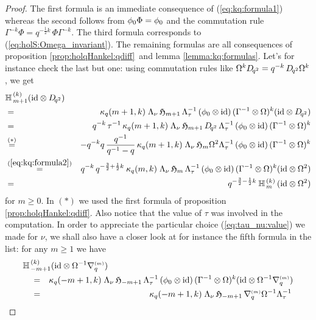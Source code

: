 \begin{proof}
The first formula is an immediate consequence of (\ref{eq:kq:formula1})
whereas the second follows from $\phi_0 \Phi = \phi_0$ and the commutation rule
$\Gamma^{-k}\Phi = q^{-\frac{1}{2}k}\,\Phi\Gamma^{-k}$.
The third formula corresponds to (\ref{eq:holS:Omega_invariant}).
The remaining formulas are all consequences of
proposition \ref{prop:holqHankel:qdiff}\ and lemma \ref{lemma:kq:formulas}\@.
Let's for instance check the last but one: using commutation rules like
$\Omega^k D_{\!q^2} = q^{-k}\, D_{\!q^2} \Omega^k$, we get
\begin{eqnarray*}
\lefteqn{\YaH{m+1}{k} (\id \tens \Dqsqr)}
\\&=&
\kq(m+1,k) \; \Lambda_\nu \, \holH{m+1} \, \Lambda_\tau^{-1}\,
         (\evzero \tens \id)\,(\Gamma^{-1} \tens \Omega)^k (\id \tens \Dqsqr)
\\ &=&
q^{-k} \, \tau^{-1} \, \kq(m+1,k) \; \Lambda_\nu \, \holH{m+1} \,\Dqsqr\, \Lambda_\tau^{-1}\,
         (\evzero \tens \id)\,(\Gamma^{-1} \tens \Omega)^k
\\ &\stackrel{(*)}{=}&
-q^{-k} q\, \frac{q^{-1}}{q^{-1}-q}\, \kq(m+1,k)
     \; \Lambda_\nu \, \holH{m} \Omega^2  \Lambda_\tau^{-1}\,
         (\evzero \tens \id)\,(\Gamma^{-1} \tens \Omega)^k
\\ &\stackrel{(\ref{eq:kq:formula2})}{=}&
q^{-k}\,q^{-\frac{3}{2} +\frac{1}{2}k}\: \kq(m,k)
     \; \Lambda_\nu \, \holH{m} \, \Lambda_\tau^{-1}\,
         (\evzero \tens \id)\,(\Gamma^{-1} \tens \Omega)^k  (\id \tens \Omega^2)
\\ &=&
q^{-\frac{3}{2} - \frac{1}{2}k}\:  \YaH{m}{k}\, (\id \tens \Omega^2)
\end{eqnarray*}
for $m\geq 0$.
In $(*)$ we used the first formula of proposition \ref{prop:holqHankel:qdiff}\@.
Also notice that the value of $\tau$ was involved in the computation.
In order to appreciate the particular choice (\ref{eq:tau_nu:value}) we made for $\nu$,
we shall also have a closer look at for instance the fifth formula in the list:
for any $m\geq 1$ we have
\begin{eqnarray*}
\lefteqn{ \YaH{-m+1}{k} (\id \tens \Omega^{-1} \nabq{m})}
\\
&\hspace{1em}=&
         \kq(-m+1,k) \; \Lambda_\nu \, \holH{-m+1} \, \Lambda_\tau^{-1}\,
         (\evzero \tens \id)\,(\Gamma^{-1} \tens \Omega)^k
         (\id \tens \Omega^{-1} \nabq{m})
\\
&\hspace{1em}=&
    \kq(-m+1,k) \; \Lambda_\nu \, \holH{-m+1} \, \nabq{m} \Omega^{-1} \Lambda_\tau^{-1}\,

\end{eqnarray*}
\end{proof}
